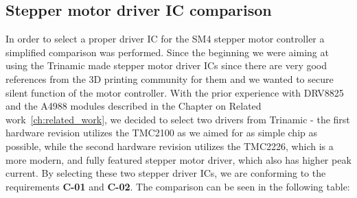 \subsection{Stepper motor driver IC comparison}
\label{subsec:stepper_ic}
In order to select a proper driver IC for the SM4 stepper motor controller a simplified comparison was performed.
Since the beginning we were aiming at using the Trinamic made stepper motor driver ICs since there are very good references from the 3D printing community\cite{prusa_original_2017,prusa_original_2019,3daddict_stepper_2020}  for them and we wanted to secure silent function of the motor controller.
With the prior experience with DRV8825 and the A4988 modules described in the Chapter on Related work~\ref{ch:related_work}, we decided to select two drivers from Trinamic - the first hardware revision utilizes the TMC2100 as we aimed for as simple chip as possible, while the second hardware revision utilizes the TMC2226, which is a more modern, and fully featured stepper motor driver, which also has higher peak current.
By selecting these two stepper driver ICs, we are conforming to the requirements \textbf{C-01} and \textbf{C-02}.
The comparison can be seen in the following table:

